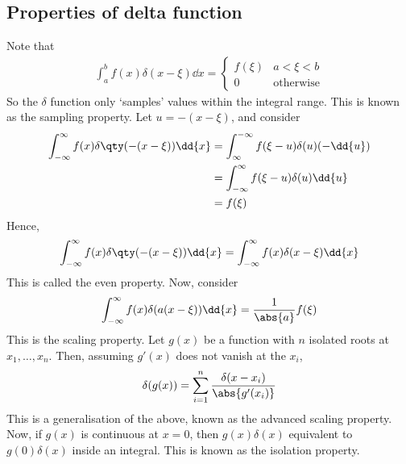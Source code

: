 \subsection{Properties of delta function}
Note that
\begin{align*}
	\int_a^b f(x) \delta(x-\xi) \dd{x} = \begin{cases}
		f(\xi) & a < \xi < b \\
		0 & \text{otherwise}
	\end{cases}
\end{align*}
So the $\delta$ function only `samples' values within the integral range.
This is known as the sampling property.
Let $u = -(x-\xi)$, and consider
\begin{align*}
	\int_{-\infty}^\infty f(x) \delta\qty(-(x-\xi)) \dd{x} &= \int_{\infty}^{-\infty} f(\xi - u) \delta(u) (-\dd{u}) \\
    &= \int_{-\infty}^\infty f(\xi - u) \delta(u) \dd{u} \\
    &= f(\xi)
\end{align*}
Hence,
\begin{align*}
	\int_{-\infty}^\infty f(x) \delta\qty(-(x-\xi)) \dd{x} = \int_{-\infty}^\infty f(x) \delta(x-\xi) \dd{x}
\end{align*}
This is called the even property.
Now, consider
\begin{align*}
	\int_{-\infty}^\infty f(x) \delta(a(x-\xi)) \dd{x} = \frac{1}{\abs{a}}f(\xi)
\end{align*}
This is the scaling property.
Let $g(x)$ be a function with $n$ isolated roots at $x_1, \dots, x_n$.
Then, assuming $g'(x)$ does not vanish at the $x_i$,
\begin{align*}
	\delta(g(x)) = \sum_{i=1}^n \frac{\delta(x - x_i)}{\abs{g'(x_i)}}
\end{align*}
This is a generalisation of the above, known as the advanced scaling property.
Now, if $g(x)$ is continuous at $x = 0$, then $g(x) \delta(x)$ equivalent to $g(0) \delta(x)$ inside an integral.
This is known as the isolation property.

